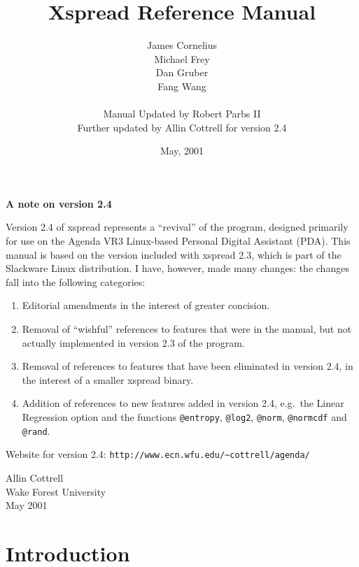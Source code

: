 \documentclass[titlepage]{article}
\title{Xspread Reference Manual}
\author{James Cornelius\\ Michael Frey\\ Dan Gruber\\ Fang Wang\\
        \\
        Manual Updated by Robert Parbs II\\
      Further updated by Allin Cottrell for version 2.4}
\date{May, 2001}
\begin{document}
\maketitle 

\tableofcontents

\vspace{24pt}

\begin{center}
\textbf{A note on version 2.4}
\end{center}

Version 2.4 of \textsf{xspread} represents a ``revival'' of the
program, designed primarily for use on the Agenda VR3 Linux-based
Personal Digital Assistant (PDA).  This manual is based on the version
included with \textsf{xspread 2.3}, which is part of the Slackware
Linux distribution.  I have, however, made many changes: the changes
fall into the following categories:

\begin{enumerate}
\item Editorial amendments in the interest of greater concision.
\item Removal of ``wishful'' references to features that were in the
  manual, but not actually implemented in version 2.3 of the program.
\item Removal of references to features that have been eliminated in
  version 2.4, in the interest of a smaller \textsf{xspread} binary.
\item Addition of references to new features added in version 2.4,
  e.g.\ the Linear Regression option and the functions
  \texttt{@entropy}, \texttt{@log2}, \texttt{@norm}, \texttt{@normcdf}
  and \texttt{@rand}.
\end{enumerate}

Website for version 2.4: \verb+http://www.ecn.wfu.edu/~cottrell/agenda/+

\begin{raggedleft}
Allin Cottrell\\
Wake Forest University\\
May 2001\\
\end{raggedleft}


\section{Introduction}
\end{document}

